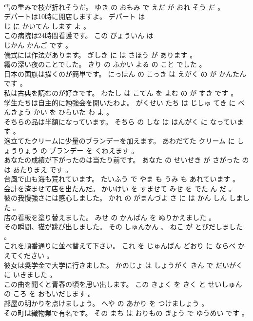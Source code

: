 \documentclass[8pt]{extreport}
\begin{document}
\begin{CJK}{UTF8}{min}
\\	雪の重みで枝が折れそうだ。	ゆき の おもみ で えだ が おれ そう だ 。 
\\	デパートは10時に開店しますよ。	デパート は 
\\	じ に かいてん します よ 。 
\\	この病院は24時間看護です。	この びょういん は 
\\	じかん かんご です 。 
\\	儀式には作法があります。	ぎしき に は さほう が あります 。 
\\	霧の深い夜のことでした。	きり の ふかい よる の こと でした 。 
\\	日本の国旗は描くのが簡単です。	にっぽん の こっき は えがく の が かんたん です 。 
\\	私は古典を読むのが好きです。	わたし は こてん を よむ の が すき です 。 
\\	学生たちは自主的に勉強会を開いたわよ。	がくせい たち は じしゅ てき に べんきょう かい を ひらいた わ よ 。 
\\	そちらの品は半額になっています。	そちら の しな は はんがく に なっています 。 
\\	泡立てたクリームに少量のブランデーを加えます。	あわだてた クリーム に しょうりょう の ブランデー を くわえます 。 
\\	あなたの成績が下がったのは当たり前です。	あなた の せいせき が さがった の は あたりまえ です 。 
\\	台風で山も海も荒れています。	たいふう で やま も うみ も あれています 。 
\\	会計を済ませて店を出たんだ。	かいけい を すませて みせ を でた ん だ 。 
\\	彼の我慢強さには感心しました。	かれ の がまんづよ さ に は かん しん しました 。 
\\	店の看板を塗り替えました。	みせ の かんばん を ぬりかえました 。 
\\	その瞬間、猫が跳び出しました。	その しゅんかん 、 ねこ が とびだしました 。 
\\	これを順番通りに並べ替えて下さい。	これ を じゅんばん どおり に ならべ かえてください 。 
\\	彼女は奨学金で大学に行きました。	かのじょ は しょうがく きん で だいがく に いきました 。 
\\	この曲を聞くと青春の頃を思い出します。	この きょく を きく と せいしゅん の ころ を おもいだします 。 
\\	部屋の明かりを点けましょう。	へや の あかり を つけましょう 。 
\\	その町は織物業で有名です。	その まち は おりもの ぎょう で ゆうめい です 。 

\end{CJK}
\end{document}
